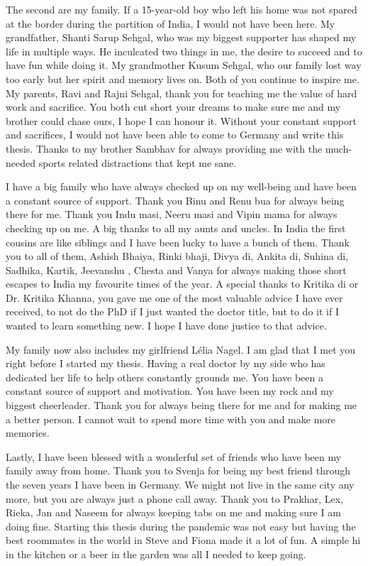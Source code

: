 The second are my family. If a 15-year-old boy who left his home was not spared at the border during the partition of India, I would not have been here. My grandfather, Shanti Sarup Sehgal, who was my biggest supporter has shaped my life in multiple ways. He inculcated two things in me, the desire to succeed and to have fun while doing it. My grandmother Kusum Sehgal, who our family lost way too early but her spirit and memory lives on. Both of you continue to inspire me. My parents, Ravi and Rajni Sehgal, thank you for teaching me the value of hard work and sacrifice. You both cut short your dreams to make sure me and my brother could chase ours, I hope I can honour it. Without your constant support and sacrifices, I would not have been able to come to Germany and write this thesis. Thanks to my brother Sambhav for always providing me with the much-needed sports related distractions that kept me sane. 

I have a big family who have always checked up on my well-being and have been a constant source of support. Thank you Binu and Renu bua for always being there for me. Thank you Indu masi, Neeru masi and Vipin mama for always checking up on me. A big thanks to all my aunts and uncles.
In India the first cousins are like siblings and I have been lucky to have a bunch of them. Thank you to all of them, Ashish Bhaiya, Rinki bhaji, Divya di, Ankita di, Suhina di, Sadhika, Kartik, Jeevanshu , Chesta and Vanya for always making those short escapes to India my favourite times of the year. A special thanks to Kritika di or Dr. Kritika Khanna, you gave me one of the most valuable advice I have ever received, to not do the PhD if I just wanted the doctor title, but to do it if I wanted to learn something new. I hope I have done justice to that advice.     

My family now also includes my girlfriend Lélia Nagel. I am glad that I met you right before I started my thesis. Having a real doctor by my side who has dedicated her life to help others constantly grounds me. You have been a constant source of support and motivation. You have been my rock and my biggest cheerleader. Thank you for always being there for me and for making me a better person. I cannot wait to spend more time with you and make more memories.

Lastly, I have been blessed with a wonderful set of friends who have been my family away from home. Thank you to Svenja for being my best friend through the seven years I have been in Germany. We might not live in the same city any more, but you are always just a phone call away. Thank you to Prakhar, Lex, Rieka, Jan and Naseem for always keeping tabs on me and making sure I am doing fine. Starting this thesis during the pandemic was not easy but having the best roommates in the world in Steve and Fiona made it a lot of fun. A simple hi in the kitchen or a beer in the garden was all I needed to keep going. 

